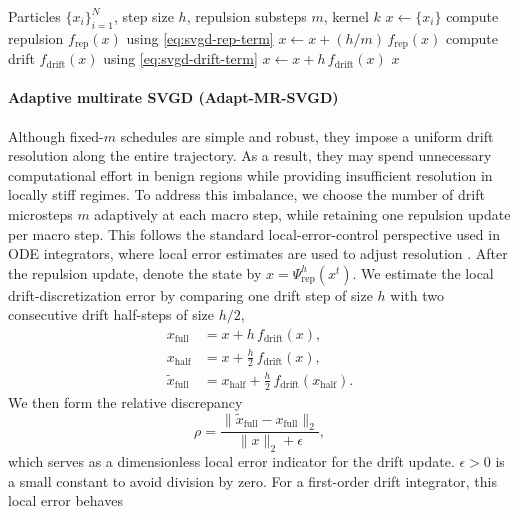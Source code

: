 \begin{algorithm}[t]
\caption{Fixed multirate SVGD (MR-SVGD)}
\label{alg:mr_svgd}
\begin{algorithmic}[1]
\Require Particles $\{x_i\}_{i=1}^N$, step size $h$, repulsion substeps $m$, kernel $k$
\State $x \leftarrow \{x_i\}$
  \State compute repulsion $f_{\text{rep}}(x)$ using \cref{eq:svgd-rep-term}
  \State $x \leftarrow x + (h/m)\,f_{\text{rep}}(x)$
\EndFor
\State compute drift $f_{\text{drift}}(x)$ using \cref{eq:svgd-drift-term}
\State $x \leftarrow x + h\,f_{\text{drift}}(x)$
\State \Return $x$
\end{algorithmic}
\end{algorithm}

\paragraph{Adaptive multirate SVGD (Adapt-MR-SVGD)}
Although fixed-$m$ schedules are simple and robust, they impose a uniform drift
resolution along the entire trajectory. As a result, they may spend unnecessary
computational effort in benign regions while providing insufficient resolution
in locally stiff regimes. To address this imbalance, we choose the number of
drift microsteps $m$ adaptively at each macro step, while retaining one
repulsion update per macro step. This follows the standard local-error-control
perspective used in ODE
integrators, where local error estimates are used to adjust resolution
\cite[Ch. II]{Hairer_book_I}. After the repulsion update, denote the state by
$x=\Psi_{\text{rep}}^{h}(x^{t})$. We estimate the local
drift-discretization error by comparing one drift step of size
$h$ with two consecutive drift half-steps of size $h/2$,
\begin{align}
  x_{\text{full}} &= x + h\,f_{\text{drift}}(x), \\
  x_{\text{half}} &= x + \tfrac{h}{2}\,f_{\text{drift}}(x), \\
  \tilde{x}_{\text{full}}  &= x_{\text{half}} + \tfrac{h}{2}\,f_{\text{drift}}(x_{\text{half}}).
\end{align}
We then form the relative discrepancy
\begin{equation}
  \rho
  = \frac{\|\tilde{x}_{\text{full}} - x_{\text{full}}\|_2}{\|x\|_2 + \epsilon},
  \label{eq:adapt-mr-error}
\end{equation}
which serves as a dimensionless local error indicator for the drift update. $\epsilon>0$ is a small constant to avoid division by zero.
For a first-order drift integrator, this local error behaves
